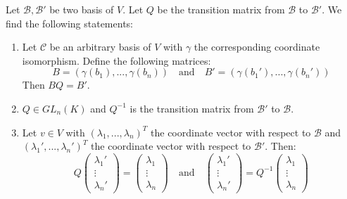         \begin{theorem}\label{linalgebra:theorem:transition_matrix}
		Let $\mathcal{B}, \mathcal{B}'$ be two basis of $V$. Let $Q$ be the transition matrix from $\mathcal{B}$ to $\mathcal{B}'$. We find the following statements:
	        \begin{enumerate}
			\item Let $\mathcal{C}$ be an arbitrary basis of $V$ with $\gamma$ the corresponding coordinate isomorphism. Define the following matrices:
        	        	\[
        	        		B=(\gamma(b_1), ..., \gamma(b_n))\quad\text{and}\quad B'=(\gamma(b_1'), ..., \gamma(b_n'))
        	        	\]
		                Then $BQ = B'$.
			\item $Q\in GL_n(K)$ and $Q^{-1}$ is the transition matrix from $\mathcal{B}'$ to $\mathcal{B}$.
                	\item Let $v\in V$ with $(\lambda_1, ..., \lambda_n)^T$ the coordinate vector with respect to $\mathcal{B}$ and $(\lambda_1', ..., \lambda_n')^T$ the coordinate vector with respect to $\mathcal{B}'$. Then:
                	\[
		                Q\left(
				\begin{array}{c}
					\lambda_1'\\
                			\vdots\\
			        	\lambda_n'
				\end{array}
                        	\right)
                        	=
		                \left(
                		\begin{array}{c}
					\lambda_1\\
                			\vdots\\
			        	\lambda_n
				\end{array}
                        	\right)
				\quad\text{and}\quad
                        	\left(
                        	\begin{array}{c}
					\lambda_1'\\
                        		\vdots\\
			        	\lambda_n'
				\end{array}
		                \right)
                	        =
                	        Q^{-1}\left(
                	        \begin{array}{c}
					\lambda_1\\
                		        \vdots\\
			                \lambda_n
				\end{array}
                        	\right)
			\]
		\end{enumerate}
	\end{theorem}
        
